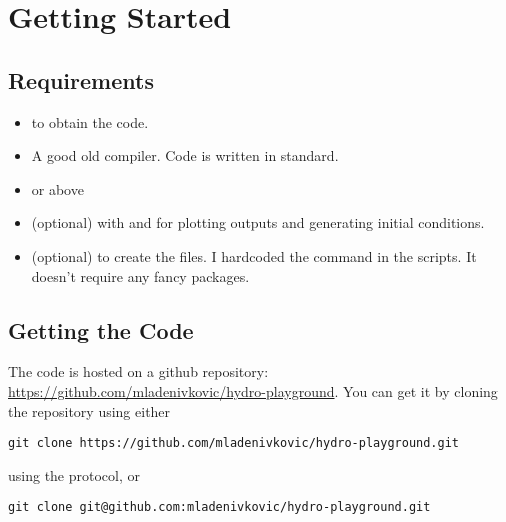\newpage
\section{Getting Started}


\subsection{Requirements}

\begin{itemize}
\item   {} to obtain the code.
\item   A good old  compiler. Code is written in 
        standard.
\item   {} or above
\item   (optional)  with  and
         for plotting outputs and generating initial
        conditions.
\item   (optional)  to create the  files. I
        hardcoded the  command in the scripts. It doesn't
        require any fancy  packages.
\end{itemize}





\subsection{Getting the Code}


The code is hosted on a github repository:
\url{https://github.com/mladenivkovic/hydro-playground}. You can get it by
cloning the repository using either

\begin{lstlisting}
git clone https://github.com/mladenivkovic/hydro-playground.git
\end{lstlisting}


using the  protocol, or

\begin{lstlisting}
git clone git@github.com:mladenivkovic/hydro-playground.git
\end{lstlisting}

